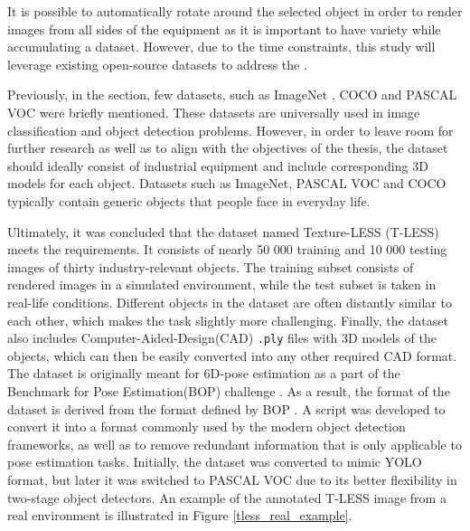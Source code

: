 It is possible to automatically rotate around the selected object in order to render images from all sides of the equipment as it is important to have variety while accumulating a dataset. However, due to the time constraints, this study will leverage existing open-source datasets to address the . 

Previously, in the  section, few datasets, such as ImageNet \cite{Russakovsky2014}, COCO \cite{Lin2014} and PASCAL VOC \cite{Everingham10} were briefly mentioned. These datasets are universally used in image classification and object detection problems. However, in order to leave room for further research as well as to align with the objectives of the thesis, the dataset should ideally consist of industrial equipment and include corresponding 3D models for each object. Datasets such as ImageNet, PASCAL VOC and COCO typically contain generic objects that people face in everyday life. 

Ultimately, it was concluded that the dataset named Texture-LESS (T-LESS)  \cite{hodan2017tless} meets the requirements. It consists of nearly 50 000 training and 10 000 testing images of thirty industry-relevant objects. The training subset consists of rendered images in a simulated environment, while the test subset is taken in real-life conditions.  Different objects in the dataset are often distantly similar to each other, which makes the task slightly more challenging. Finally, the dataset also includes Computer-Aided-Design(CAD) \texttt{.ply} files with 3D models of the objects, which can then be easily converted into any other required CAD format. The dataset is originally meant for 6D-pose estimation \cite{hodan2017tless} as a part of the Benchmark for Pose Estimation(BOP) challenge \cite{hodan2018bop}. As a result, the format of the dataset is derived from the format defined by BOP \cite{hodan2018bop_format}. A script was developed to convert it into a format commonly used by the modern object detection frameworks, as well as to remove redundant information that is only applicable to pose estimation tasks. Initially, the dataset was converted to mimic YOLO \cite{Redmon2015a} format, but later it was switched to PASCAL VOC due to its better flexibility in two-stage object detectors. An example of the annotated T-LESS image from a real environment is illustrated in Figure \ref{tless_real_example}. 

